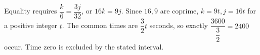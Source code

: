 Equality requires $\dfrac{k}{6}=\dfrac{3j}{32}$, or $16k=9j$. Since $16,9$ are coprime, $k=9t,j=16t$ for a positive integer $t$. The common times are $\dfrac{3}{2}t$ seconds, so exactly $\dfrac{3600}{\dfrac{3}{2}}=\boxed{2400}$ occur. Time zero is excluded by the stated interval.
